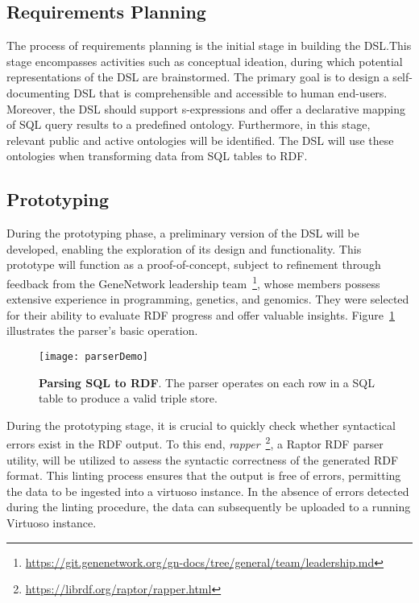 \subsection{Requirements Planning}

The process of requirements planning is the initial stage in building the DSL.\@  This stage encompasses activities such as conceptual ideation, during which potential representations of the DSL are brainstormed.  The primary goal is to design a self-documenting DSL that is comprehensible and accessible to human end-users.  Moreover, the DSL should support s-expressions and offer a declarative mapping of SQL query results to a predefined ontology.  Furthermore, in this stage, relevant public and active ontologies will be identified.  The DSL will use these ontologies when transforming data from SQL tables to RDF\@.

\subsection{Prototyping}

During the prototyping phase, a preliminary version of the DSL will be developed, enabling the exploration of its design and functionality.  This prototype will function as a proof-of-concept, subject to refinement through feedback from the GeneNetwork leadership team~\footnote{\url{https://git.genenetwork.org/gn-docs/tree/general/team/leadership.md}}, whose members possess extensive experience in programming, genetics, and genomics.  They were selected for their ability to evaluate RDF progress and offer valuable insights.  Figure~\ref{fig:parser-demo} illustrates the parser's basic operation.

\begin{figure}[H]
\centering
\texttt{[image: parserDemo]}
\caption[Parsing SQL to RDF]{\textbf{Parsing SQL to RDF}.  The parser operates on each row in a SQL table to produce a valid triple store.}\label{fig:parser-demo}
\centering
\end{figure}

During the prototyping stage, it is crucial to quickly check whether syntactical errors exist in the RDF output.  To this end, \textit{rapper}~\footnote{\url{https://librdf.org/raptor/rapper.html}}, a Raptor RDF parser utility, will be utilized to assess the syntactic correctness of the generated RDF format.  This linting process ensures that the output is free of errors, permitting the data to be ingested into a virtuoso instance.  In the absence of errors detected during the linting procedure, the data can subsequently be uploaded to a running Virtuoso instance.

